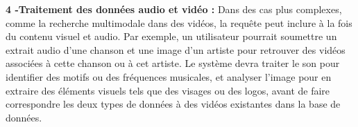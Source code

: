 \begin{section}
 \textbf{4 -Traitement des données audio et vidéo :}
 Dans des cas plus complexes, comme la recherche multimodale dans des vidéos, la requête peut inclure à la fois du
 contenu visuel et audio. Par exemple, un utilisateur pourrait soumettre un extrait audio d'une chanson et une image
 d'un artiste pour retrouver des vidéos associées à cette chanson ou à cet artiste. Le système devra traiter le son
 pour identifier des motifs ou des fréquences musicales, et analyser l'image pour en extraire des éléments visuels
 tels que des visages ou des logos, avant de faire correspondre les deux types de données à des vidéos existantes
 dans la base de données.



\end{section}
